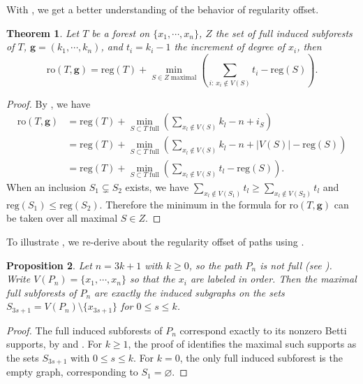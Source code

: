 \documentclass[dvipsnames,10pt]{article}
\newtheorem{theorem}{Theorem}[section]
\newtheorem{proposition}[theorem]{Proposition}
\begin{document}
With , we get a better understanding of the behavior of regularity offset.

\begin{theorem} 
    Let $T$ be a forest on $\{x_1,\cdots,x_n\}$, $Z$ the set of full induced subforests of $T$, $\mathbf{g}=(k_1,\cdots,k_n)$, and $t_i=k_i-1$ the increment of degree of $x_i$, then
    \begin{equation*}
        \mathrm{ro}(T,\mathbf{g}) = \mathrm{reg}(T) + \min_{S\in Z\;\text{maximal}}\left( \sum_{i:\,x_i\notin V(S)} t_i - \mathrm{reg}(S) \right).
    \end{equation*}
\end{theorem}

\begin{proof}
    By , we have
    \begin{align*}
        \mathrm{ro}(T,\mathbf{g}) &= \mathrm{reg}(T) + \min_{S\subset T\;\text{full}} \left( \sum_{x_l\notin V(S)}k_l -n+ i_S \right)\\
        &= \mathrm{reg}(T) + \min_{S\subset T\;\text{full}} \left( \sum_{x_l\notin V(S)}k_l -n+ |V(S)|-\mathrm{reg}(S) \right)\\
        &= \mathrm{reg}(T) + \min_{S\subset T\;\text{full}} \left( \sum_{x_l\notin V(S)}t_l-\mathrm{reg}(S) \right).
    \end{align*}
    When an inclusion $S_1\subsetneq S_2$ exists, we have $\sum_{x_l\notin V(S_1)}t_l\geqslant \sum_{x_l\notin V(S_2)}t_l$ and $\mathrm{reg}(S_1)\leqslant \mathrm{reg}(S_2)$. Therefore the minimum in the formula for $\mathrm{ro}(T,\mathbf{g})$ can be taken over all maximal $S\in Z$.
\end{proof}

To illustrate , we re-derive  about the regularity offset of paths using .

\begin{proposition}
    Let $n=3k+1$ with $k\geq0$, so the path $P_n$ is not full (see ). Write $V(P_n)=\{x_1,\cdots,x_n\}$ so that the $x_i$ are labeled in order. Then the maximal full subforests of $P_n$ are exactly the induced subgraphs on the sets $S_{3s+1}=V(P_n)\setminus\{x_{3s+1}\}$ for $0\leq s\leq k$.
\end{proposition}

\begin{proof}
    The full induced subforests of $P_n$ correspond exactly to its nonzero Betti supports, by  and . For $k\geq1$, the proof of  identifies the maximal such supports as the sets $S_{3s+1}$ with $0\leq s\leq k$. For $k=0$, the only full induced subforest is the empty graph, corresponding to $S_1=\varnothing$.
\end{proof}
\end{document}
